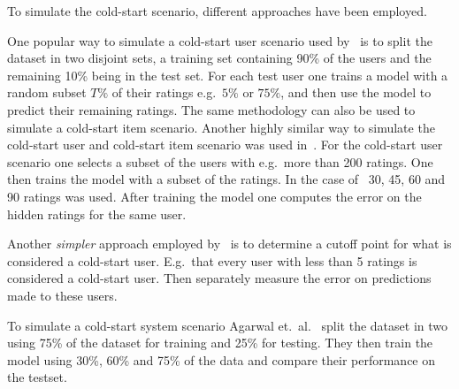 To simulate the cold-start scenario, different approaches have been employed.

One popular way to simulate a cold-start user scenario used by~\cite{Stern2009,
Lam2008} is to split the dataset in two disjoint sets, a training set
containing 90\% of the users and the remaining 10\% being in the test set. For
each test user one trains a model with a random subset $T\%$ of their ratings
e.g.\ $5\%$ or $75\%$, and then use the model to predict their remaining
ratings. The same methodology can also be used to simulate a cold-start item
scenario. Another highly similar way to simulate the cold-start user and
cold-start item scenario was used in~\cite{Rashid2002, Rashid2008}. For the
cold-start user scenario one selects a subset of the users with e.g.\ more than
200 ratings. One then trains the model with a subset of the ratings. In the
case of~\cite{Rashid2002} 30, 45, 60 and 90 ratings was used. After training
the model one computes the error on the hidden ratings for the same user.

Another \emph{simpler} approach employed by~\cite{Massa2007, Jamali2009} is to
determine a cutoff point for what is considered a cold-start user. E.g.\ that
every user with less than 5 ratings is considered a cold-start user. Then
separately measure the error on predictions made to these users.

To simulate a cold-start system scenario Agarwal et.\ al.~\cite{Agarwal2009}
split the dataset in two using 75\% of the dataset for training and 25\% for
testing. They then train the model using 30\%, 60\% and 75\% of the data and
compare their performance on the testset.




